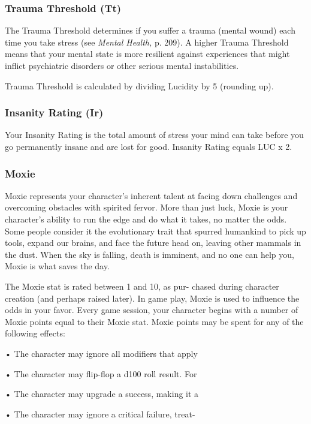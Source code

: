 \subsubsection{Trauma Threshold (Tt)}

The Trauma Threshold determines if you suffer a 
trauma (mental wound) each time you take stress (see 
\textit{Mental Health,} p. 209). A higher Trauma Threshold 
means that your mental state is more resilient against 
experiences that might inflict psychiatric disorders or 
other serious mental instabilities.

Trauma Threshold is calculated by dividing Lucidity 
by 5 (rounding up).

\subsubsection{Insanity Rating (Ir)}

Your Insanity Rating is the total amount of stress your 
mind can take before you go permanently insane and 
are lost for good. Insanity Rating equals LUC x 2.

\subsubsection{Moxie}

Moxie represents your character's inherent talent at 
facing down challenges and overcoming obstacles 
with spirited fervor. More than just luck, Moxie is 
your character's ability to run the edge and do what 
it takes, no matter the odds. Some people consider it 
the evolutionary trait that spurred humankind to pick 
up tools, expand our brains, and face the future head 
on, leaving other mammals in the dust. When the sky 
is falling, death is imminent, and no one can help you, 
Moxie is what saves the day.

The Moxie stat is rated between 1 and 10, as pur-
chased during character creation (and perhaps raised 
later). In game play, Moxie is used to influence the 
odds in your favor. Every game session, your character 
begins with a number of Moxie points equal to their 
Moxie stat. Moxie points may be spent for any of the 
following effects:

•  The character may ignore all modifiers that apply 

•  The character may flip-flop a d100 roll result. For 

•  The character may upgrade a success, making it a 

•  The character may ignore a critical failure, treat-

